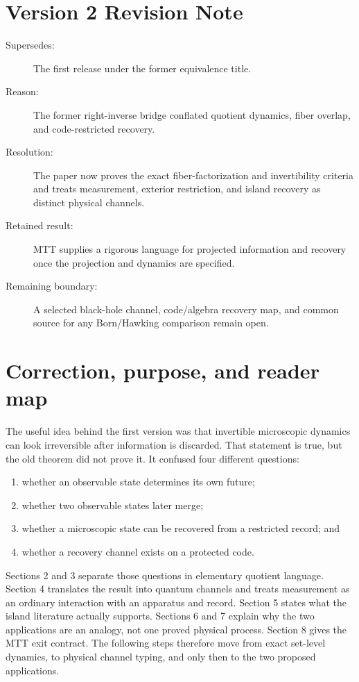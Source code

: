 \documentclass[11pt]{article}
\begin{document}
\section*{Version 2 Revision Note}
\begin{description}
\item[Supersedes:] The first release under the former equivalence title.
\item[Reason:] The former right-inverse bridge conflated quotient dynamics,
fiber overlap, and code-restricted recovery.
\item[Resolution:] The paper now proves the exact fiber-factorization and
invertibility criteria and treats measurement, exterior restriction, and
island recovery as distinct physical channels.
\item[Retained result:] MTT supplies a rigorous language for projected
information and recovery once the projection and dynamics are specified.
\item[Remaining boundary:] A selected black-hole channel, code/algebra
recovery map, and common source for any Born/Hawking comparison remain open.
\end{description}

\tableofcontents

\section{Correction, purpose, and reader map}

The useful idea behind the first version was that invertible microscopic
dynamics can look irreversible after information is discarded. That statement
is true, but the old theorem did not prove it. It confused four different
questions:
\begin{enumerate}
\item whether an observable state determines its own future;
\item whether two observable states later merge;
\item whether a microscopic state can be recovered from a restricted record;
and
\item whether a recovery channel exists on a protected code.
\end{enumerate}

Sections 2 and 3 separate those questions in elementary quotient language.
Section 4 translates the result into quantum channels and treats measurement
as an ordinary interaction with an apparatus and record. Section 5 states what
the island literature actually supports. Sections 6 and 7 explain why the two
applications are an analogy, not one proved physical process. Section 8 gives
the MTT exit contract. The following steps therefore move from exact set-level
dynamics, to physical channel typing, and only then to the two proposed
applications.
\end{document}
